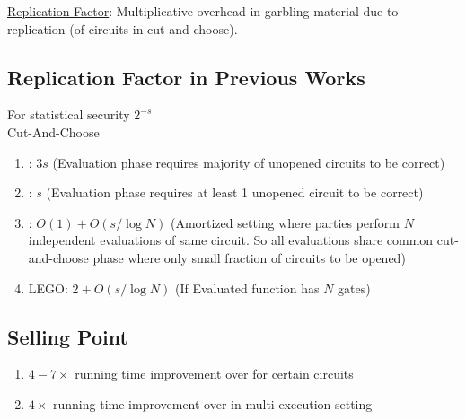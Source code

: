 \underline{Replication Factor}: Multiplicative overhead in garbling material due to replication (of circuits in cut-and-choose).

\subsection{Replication Factor in Previous Works}
For statistical security $2^{-s}$ \\

Cut-And-Choose
\begin{enumerate}
    \item \cite{sS11}: $3s$ (Evaluation phase requires majority of unopened circuits to be correct)
    \item \cite{Bra13} \cite{Lin13}: $s$ (Evaluation phase requires at least 1 unopened circuit to be correct) 
    \item \cite{LR14} \cite{HKK+14}: $O(1) + O(s/\log N)$ (Amortized setting where parties perform $N$ independent evaluations of same circuit. So all evaluations share common cut-and-choose phase where only small fraction of circuits to be opened)
    \item LEGO: $2 + O(s/\log N)$ (If Evaluated function has $N$ gates)
\end{enumerate}

\subsection{Selling Point}
\begin{enumerate}
    \item $4-7 \times$ running time improvement over \cite{WMK17} for certain circuits
    \item $4 \times$ running time improvement over \cite{RR16} in multi-execution setting
\end{enumerate}

